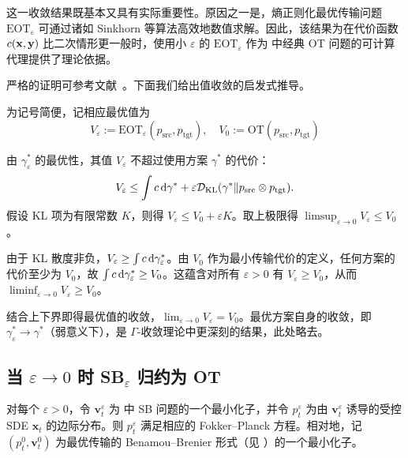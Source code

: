 这一收敛结果既基本又具有实际重要性。原因之一是，熵正则化最优传输问题 $\mathrm{EOT}_\varepsilon$ 可通过诸如 Sinkhorn 等算法高效地数值求解。因此，该结果为在代价函数 $c({\mathbf{x}}, {\mathbf{y}})$ 比二次情形更一般时，使用小 $\varepsilon$ 的 $\mathrm{EOT}_\varepsilon$ 作为  中经典 OT 问题的可计算代理提供了理论依据。


{严格的证明可参考文献~\citep{mikami2008optimal, peyre2019computational}。下面我们给出值收敛的启发式推导。

为记号简便，记相应最优值为
\[
V_\varepsilon := \mathrm{EOT}_\varepsilon(p_{\mathrm{src}}, p_{\mathrm{tgt}}), \quad
V_0 := \mathrm{OT}(p_{\mathrm{src}}, p_{\mathrm{tgt}})
\]


 由 $\gamma^*_\varepsilon$ 的最优性，其值 $V_\varepsilon$ 不超过使用方案 $\gamma^*$ 的代价：
\[
    V_\varepsilon \leq \int c  \mathop{}\!\mathrm{d}\gamma^* + \varepsilon \mathcal{D}_{\text{KL}}(\gamma^* \| p_{\mathrm{src}} \otimes p_{\mathrm{tgt}}).
\]
假设 KL 项为有限常数 $K$，则得 $V_\varepsilon \leq V_0 + \varepsilon K$。取上极限得 $\limsup_{\varepsilon \to 0} V_\varepsilon \leq V_0$。

 由于 KL 散度非负，$V_\varepsilon \geq \int c  \mathop{}\!\mathrm{d}\gamma^*_\varepsilon$。由 $V_0$ 作为最小传输代价的定义，任何方案的代价至少为 $V_0$，故 $\int c  \mathop{}\!\mathrm{d}\gamma^*_\varepsilon \geq V_0$。这蕴含对所有 $\varepsilon > 0$ 有 $V_\varepsilon \geq V_0$，从而 $\liminf_{\varepsilon \to 0} V_\varepsilon \geq V_0$。

结合上下界即得最优值的收敛，$\lim_{\varepsilon \to 0} V_\varepsilon = V_0$。最优方案自身的收敛，即 $\gamma^*_\varepsilon \to \gamma^*$（弱意义下），是 $\Gamma$-收敛理论中更深刻的结果，此处略去。

 }




\subsection{当 $\varepsilon\to 0$ 时 SB$_\varepsilon$ 归约为 OT}\label{subsec:sb-ot}
对每个 $\varepsilon > 0$，令 $\mathbf{v}_t^\varepsilon$ 为  中 SB 问题的一个最小化子，并令 $p_t^\varepsilon$ 为由 $\mathbf{v}_t^\varepsilon$ 诱导的受控 SDE $\mathbf{x}_t$ 的边际分布。则 $p_t^\varepsilon$ 满足相应的 Fokker–Planck 方程。相对地，记 $(p_t^0, \mathbf{v}_t^0)$ 为最优传输的 Benamou–Brenier 形式（见 ）的一个最小化子。

